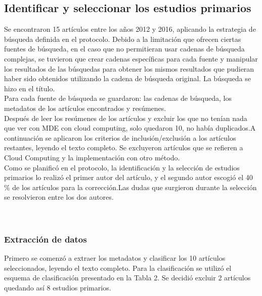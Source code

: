 \documentclass{llncs}
\begin{document}
\subsection{Identificar y seleccionar los estudios primarios}
Se encontraron 15 artículos entre los años 2012 y 2016, aplicando la estrategia de búsqueda definida en el protocolo. Debido a la limitación que ofrecen ciertas fuentes de búsqueda, en el caso que no permitieran usar cadenas de búsqueda complejas, se tuvieron que crear cadenas específicas para cada fuente y manipular los resultados de las búsquedas para obtener los mismos resultados que pudieran haber sido obtenidos utilizando la cadena de búsqueda original. La búsqueda se hizo en el título.\\
Para cada fuente de búsqueda se guardaron: las cadenas de búsqueda, los metadatos de los artículos encontrados y resúmenes.\\
Después de leer los resúmenes de los artículos y excluir los que no tenían nada que ver con MDE con cloud computing, solo quedaron 10, no había duplicados.A continuación se aplicaron los criterios de inclusión/exclusión a los artículos restantes, leyendo el texto completo. Se excluyeron artículos que se refieren a Cloud Computing y la implementación con otro método.\\
Como se planificó en el protocolo, la identificación y la selección de estudios primarios lo realizó el primer autor del artículo, y el segundo autor escogió el 40 \% de los artículos para la corrección.Las dudas que surgieron durante la selección se resolvieron entre los dos autores.\\ \\ \\

\subsubsection{Extracción de datos}
Primero se comenzó a extraer los metadatos y clasificar los 10 artículos seleccionados, leyendo el texto completo. Para la clasificación se utilizó el esquema de clasificación presentado en la Tabla 2. Se decidió excluir 2 artículos quedando así 8 estudios primarios.
\end{document}
